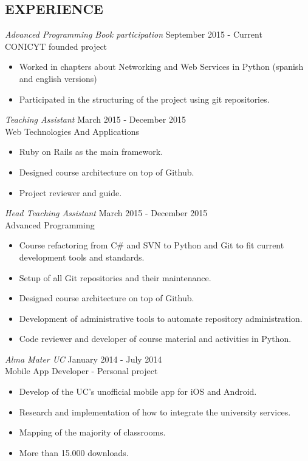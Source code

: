 \documentclass[margin, 10pt]{res} %
\begin{document}
\begin{resume}

\section{EXPERIENCE}

{\sl Advanced Programming Book participation} \hfill September 2015 - Current \\
CONICYT founded project
\begin{itemize}  \itemsep -2pt
\item Worked in chapters about Networking and Web Services in Python (spanish and english versions)
\item Participated in the structuring of the project using git repositories.
\end{itemize}

{\sl Teaching Assistant} \hfill March 2015 - December 2015 \\
Web Technologies And Applications
\begin{itemize}  \itemsep -2pt
\item Ruby on Rails as the main framework.
\item Designed course architecture on top of Github.
\item Project reviewer and guide.
\end{itemize}

{\sl Head Teaching Assistant} \hfill March 2015 - December 2015 \\
Advanced Programming
\begin{itemize}  \itemsep -2pt
\item Course refactoring from C\# and SVN to Python and Git to fit current development tools and standards.
\item Setup of all Git repositories and their maintenance.
\item Designed course architecture on top of Github.
\item Development of administrative tools to automate repository administration.
\item Code reviewer and developer of course material and activities in Python.
\end{itemize}

{\sl Alma Mater UC } \hfill January 2014 - July 2014 \\
Mobile App Developer - Personal project
\begin{itemize}  \itemsep -2pt
\item Develop of the UC's unofficial mobile app for iOS and Android.
\item Research and implementation of how to integrate the university services.
\item Mapping of the majority of classrooms.
\item More than 15.000 downloads.
\end{itemize}


\end{resume}
\end{document}
